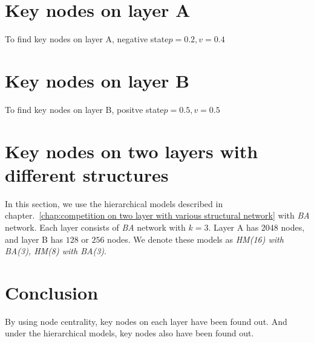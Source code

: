 \section{Key nodes on layer A}
To find key nodes on layer A, negative state$p=0.2, v=0.4$


\section{Key nodes on layer B}
To find key nodes on layer B, positve state$p=0.5, v=0.5$


\section{Key nodes on two layers with different structures}
In this section, we use the hierarchical models described in chapter.~\ref{chap:competition on two layer with various structural network} with \textit{BA} network. Each layer consists of \textit{BA} network with $k=3$. Layer A has 2048 nodes, and layer B has $128$ or $256$ nodes. We denote these models as \textit{HM(16) with BA(3), HM(8) with BA(3)}. 

\section{Conclusion}
By using node centrality, key nodes on each layer have been found out. 
And under the hierarchical models, key nodes also have been found out. 